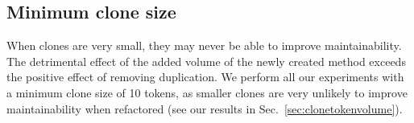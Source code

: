 \documentclass[sigconf,review,anonymous]{acmart}
\begin{document}
\subsection{Minimum clone size}
When clones are very small, they may never be able to improve maintainability. The detrimental effect of the added volume of the newly created method exceeds the positive effect of removing duplication. We perform all our experiments with a minimum clone size of 10 tokens, as smaller clones are very unlikely to improve maintainability when refactored (see our results in Sec.~\ref{sec:clonetokenvolume}).



\end{document}

